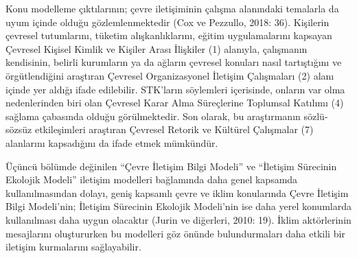 \documentclass[
]{book}
\begin{document}
Konu modelleme çıktılarının; çevre iletişiminin çalışma alanındaki temalarla da uyum içinde olduğu gözlemlenmektedir (Cox ve Pezzullo, 2018: 36). Kişilerin çevresel tutumlarını, tüketim alışkanlıklarını, eğitim uygulamalarını kapsayan Çevresel Kişisel Kimlik ve Kişiler Arası İlişkiler (1) alanıyla, çalışmanın kendisinin, belirli kurumların ya da ağların çevresel konuları nasıl tartıştığını ve örgütlendiğini araştıran Çevresel Organizasyonel İletişim Çalışmaları (2) alanı içinde yer aldığı ifade edilebilir. STK'ların söylemleri içerisinde, onların var olma nedenlerinden biri olan Çevresel Karar Alma Süreçlerine Toplumsal Katılımı (4) sağlama çabasında olduğu görülmektedir. Son olarak, bu araştırmanın sözlü-sözsüz etkileşimleri araştıran Çevresel Retorik ve Kültürel Çalışmalar (7) alanlarını kapsadığını da ifade etmek mümkündür.

Üçüncü bölümde değinilen ``Çevre İletişim Bilgi Modeli'' ve ``İletişim Sürecinin Ekolojik Modeli'' iletişim modelleri bağlamında daha genel kapsamda kullanılmasından dolayı, geniş kapsamlı çevre ve iklim konularında Çevre İletişim Bilgi Modeli'nin; İletişim Sürecinin Ekolojik Modeli'nin ise daha yerel konumlarda kullanılması daha uygun olacaktır (Jurin ve diğerleri, 2010: 19). İklim aktörlerinin mesajlarını oluştururken bu modelleri göz önünde bulundurmaları daha etkili bir iletişim kurmalarını sağlayabilir.
\end{document}
